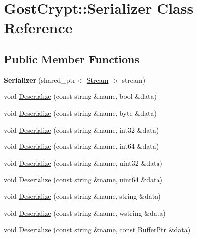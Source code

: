 \hypertarget{class_gost_crypt_1_1_serializer}{}\section{Gost\+Crypt\+:\+:Serializer Class Reference}
\label{class_gost_crypt_1_1_serializer}
\subsection*{Public Member Functions}
\begin{DoxyCompactItemize}
\item 
\mbox{\label{class_gost_crypt_1_1_serializer_a8f4c289180254e41d6d62a51eeba2711}} 
{\bfseries Serializer} (shared\+\_\+ptr$<$ \hyperlink{class_gost_crypt_1_1_stream}{Stream} $>$ stream)
\item 
void \hyperlink{class_gost_crypt_1_1_serializer_aa5b0b762052fe908fe1c1865e904164f}{Deserialize} (const string \&name, bool \&data)
\item 
void \hyperlink{class_gost_crypt_1_1_serializer_a9bd2e88798cba846f02ba2ff285d1579}{Deserialize} (const string \&name, byte \&data)
\item 
void \hyperlink{class_gost_crypt_1_1_serializer_a45edef44004fad6f89e56f2dc73dcc6d}{Deserialize} (const string \&name, int32 \&data)
\item 
void \hyperlink{class_gost_crypt_1_1_serializer_ac71a98ac12110b3beba2e28db2d986f5}{Deserialize} (const string \&name, int64 \&data)
\item 
void \hyperlink{class_gost_crypt_1_1_serializer_a980a6e567c6b29b947029bfdb8ea16d1}{Deserialize} (const string \&name, uint32 \&data)
\item 
void \hyperlink{class_gost_crypt_1_1_serializer_a213863358463ed0a624389ef4db83299}{Deserialize} (const string \&name, uint64 \&data)
\item 
void \hyperlink{class_gost_crypt_1_1_serializer_a71f08319e0e89d80e688c415498df173}{Deserialize} (const string \&name, string \&data)
\item 
void \hyperlink{class_gost_crypt_1_1_serializer_a657ea97a4c212470165ece8fd77b4502}{Deserialize} (const string \&name, wstring \&data)
\item 
void \hyperlink{class_gost_crypt_1_1_serializer_a66fa68e8213eab8933da9a5c854651e8}{Deserialize} (const string \&name, const \hyperlink{class_gost_crypt_1_1_buffer_ptr}{Buffer\+Ptr} \&data)

\end{DoxyCompactItemize}
